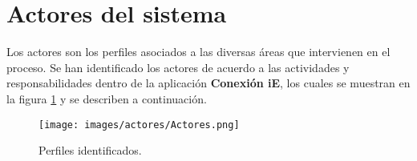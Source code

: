 \section{Actores del sistema}\label{sec:Comportamiento:ActoresSistema}

Los actores son los perfiles asociados a las diversas áreas que intervienen en el proceso. Se han identificado los actores de acuerdo a las actividades y responsabilidades dentro de la aplicación \textbf{Conexión iE}, los cuales se muestran en la figura \ref{fig:perfilesWeb} y se describen a continuación.


    \begin{figure}[h!]
      \begin{center}
	  \texttt{[image: images/actores/Actores.png]}
      \caption{Perfiles identificados.}
      \label{fig:perfilesWeb}
      \end{center}
    \end{figure}


